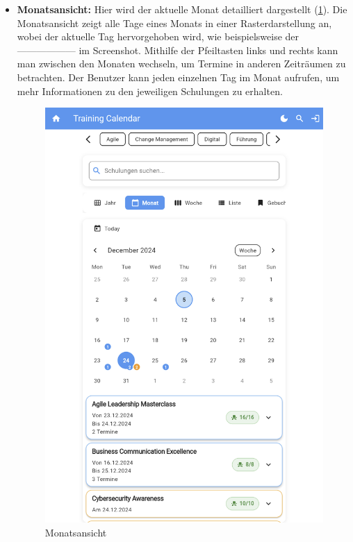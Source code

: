 \begin{itemize}
    \item \textbf{Monatsansicht:} Hier wird der aktuelle Monat detailliert dargestellt (\ref{Monat}). 
Die Monatsansicht zeigt alle Tage eines Monats in einer Rasterdarstellung an, wobei der aktuelle Tag hervorgehoben wird, wie beispielsweise der ------------------ im Screenshot. Mithilfe der Pfeiltasten links und rechts kann man zwischen den Monaten wechseln, um Termine in anderen Zeiträumen zu betrachten.
Der Benutzer kann jeden einzelnen Tag im Monat aufrufen, um mehr Informationen zu den jeweiligen Schulungen zu erhalten.     
\begin{figure}[htbp!]
        \centering
        \includegraphics[scale=0.2]{img/flutter_05.png}
        \caption{Monatsansicht}
        \label{Monat}
    \end{figure}


\end{itemize}
